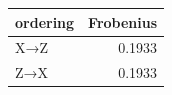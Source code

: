 \begin{tabular}{l r}
\toprule
ordering & Frobenius \\
\midrule
X→Z & 0.1933 \\
Z→X & 0.1933 \\
\bottomrule
\end{tabular}

